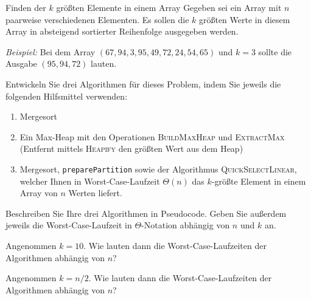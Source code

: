 \documentclass[11pt,a4paper]{article}
\begin{document}
\begin{aufgabe}{3}{Finden der $k$ größten Elemente in einem Array}
    Gegeben sei ein Array mit $n$ paarweise verschiedenen Elementen. Es sollen die $k$ größten Werte in diesem Array in absteigend sortierter Reihenfolge ausgegeben werden.

    \textit{Beispiel:} Bei dem Array $(67, 94, 3, 95, 49, 72, 24, 54, 65)$ und $k = 3$ sollte die Ausgabe $(95, 94, 72)$ lauten.

    Entwickeln Sie drei Algorithmen für dieses Problem, indem Sie jeweils die folgenden Hilfsmittel verwenden:
    \begin{enumerate}
        \item Mergesort
        \item Ein Max-Heap mit den Operationen \textsc{BuildMaxHeap} und \textsc{ExtractMax} (Entfernt mittels \textsc{Heapify} den größten Wert aus dem Heap)
        \item Mergesort, \texttt{preparePartition} sowie der Algorithmus \textsc{QuickSelectLinear}, welcher Ihnen in Worst-Case-Laufzeit $\Theta(n)$ das $k$-größte Element in einem Array von $n$ Werten liefert.
    \end{enumerate}

    Beschreiben Sie Ihre drei Algorithmen in Pseudocode. Geben Sie außerdem jeweils die Worst-Case-Laufzeit in $\Theta$-Notation abhängig von $n$ und $k$ an.

    Angenommen $k = 10$. Wie lauten dann die Worst-Case-Laufzeiten der Algorithmen abhängig von $n$?

    Angenommen $k = n / 2$. Wie lauten dann die Worst-Case-Laufzeiten der Algorithmen abhängig von $n$?
\end{aufgabe}
\end{document}
